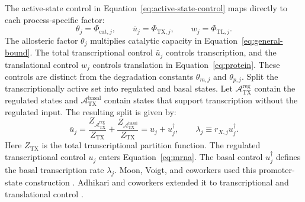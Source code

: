 The active-state control in Equation~\eqref{eq:active-state-control} maps
directly to each process-specific factor:
\begin{equation}\label{eq:control-mapping}
  \theta_j = \Phi_{\mathrm{cat},j},
  \qquad
  \bar u_j = \Phi_{\mathrm{TX},j},
  \qquad
  w_j = \Phi_{\mathrm{TL},j}.
\end{equation}
The allosteric factor $\theta_j$ multiplies catalytic capacity in
Equation~\eqref{eq:general-bound}. The total transcriptional control
$\bar u_j$ controls transcription, and the translational control $w_j$
controls translation in
Equation~\eqref{eq:protein}. These controls are distinct from the
degradation constants $\theta_{m,j}$ and $\theta_{p,j}$. Split the
transcriptionally active set into regulated and basal states.
Let $\mathcal A_{\mathrm{TX}}^{\mathrm{reg}}$ contain the regulated states
and $\mathcal A_{\mathrm{TX}}^{\mathrm{basal}}$ contain states that support
transcription without the regulated input. The resulting split is given by:
\begin{equation}\label{eq:control-split}
  \bar u_j
    = \frac{Z_{\mathcal A_{\mathrm{TX}}^{\mathrm{reg}}}}{Z_{\mathrm{TX}}}
    + \frac{Z_{\mathcal A_{\mathrm{TX}}^{\mathrm{basal}}}}{Z_{\mathrm{TX}}}
    = u_j + u_j^{\dagger},
  \qquad
  \lambda_j \equiv r_{X,j}u_j^{\dagger}.
\end{equation}
Here $Z_{\mathrm{TX}}$ is the total transcriptional partition function. The
regulated transcriptional control $u_j$ enters Equation~\eqref{eq:mrna}.
The basal control $u_j^{\dagger}$ defines the basal transcription rate
$\lambda_j$. Moon, Voigt, and coworkers used this
promoter-state construction \cite{Moon2012}. Adhikari and coworkers
extended it to transcriptional and translational control
\cite{Adhikari2020}.

